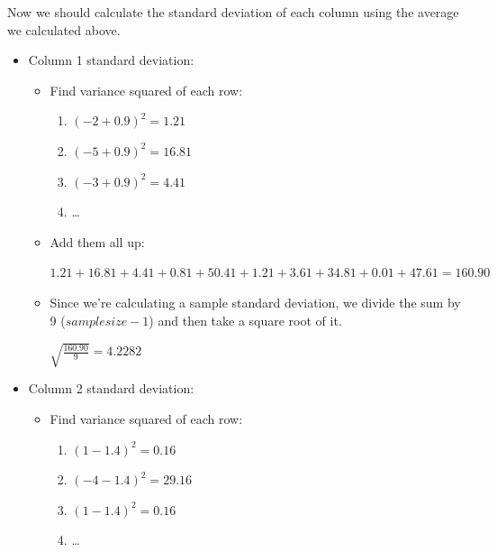 \documentclass[12pt]{article}
\begin{document}
\noindent
Now we should calculate the standard deviation of each column using the average we calculated above.\\
\begin{itemize}
\item
Column 1 standard deviation:\\

\begin{itemize}
\item
Find variance squared of each row:\\

\begin{enumerate}
\item
$ (-2+0.9)^2 = 1.21$
\item
$ (-5+0.9)^2 = 16.81$
\item
$ (-3+0.9)^2 = 4.41$
\item
\ldots
\end{enumerate}

\item
Add them all up:\\
\begin{center}
$1.21+16.81+4.41+0.81+50.41+1.21+3.61+34.81+0.01+47.61 = 160.90$
\end{center}

\item
Since we're calculating a sample standard deviation, we divide the sum by 9 ($sample size - 1$) and then take a square root of it.\\
\begin{center}
$\sqrt{\frac{160.90}{9}} = 4.2282$
\end{center}

\end{itemize}

\item
Column 2 standard deviation:\\

\begin{itemize}
\item
Find variance squared of each row:\\

\begin{enumerate}
\item
$ (1-1.4)^2 = 0.16$
\item
$ (-4-1.4)^2 = 29.16$
\item
$ (1-1.4)^2 = 0.16$
\item
\ldots
\end{enumerate}


\end{itemize}
\end{itemize}
\end{document}
